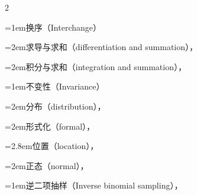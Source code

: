 \begin{multicols}{2}
\par\addvspace{2pt}
\par\noindent\hangindent=1em\hspace*{0em}\label{idx:584}换序（Interchange）\par
\par\noindent\hangindent=2em\hspace*{1em}\label{idx:585}求导与求和（differentiation and summation），\hyperref[thm:2.4.8]{\pageref*{thm:2.4.8}}\par
\par\noindent\hangindent=2em\hspace*{1em}\label{idx:586}积分与求和（integration and summation），\hyperref[thm:2.4.10]{\pageref*{thm:2.4.10}}\par
\par\addvspace{2pt}
\par\noindent\hangindent=1em\hspace*{0em}\label{idx:587}不变性（Invariance）\par
\par\noindent\hangindent=2em\hspace*{1em}\label{idx:588}分布（distribution），\hyperref[def:6.4.4]{\pageref*{def:6.4.4}}\par
\par\noindent\hangindent=2em\hspace*{1em}\label{idx:589}形式化（formal），\hyperref[idxocc:589:272]{\pageref*{idxocc:589:272}}\par
\par\noindent\hangindent=2.8em\hspace*{1.8em}\label{idx:590}位置（location），\hyperref[exercise:6.41]{\pageref*{exercise:6.41}}\par
{}
\par\noindent\hangindent=2em\hspace*{1em}\label{idx:591}正态（normal），\hyperref[ex:6.4.6]{\pageref*{ex:6.4.6}}\par
\par\addvspace{2pt}
\par\noindent\hangindent=1em\hspace*{0em}\label{idx:592}逆二项抽样（Inverse binomial sampling），\hyperref[ex:3.2.6]{\pageref*{ex:3.2.6}}\par
\par\addvspace{2pt}

\end{multicols}
